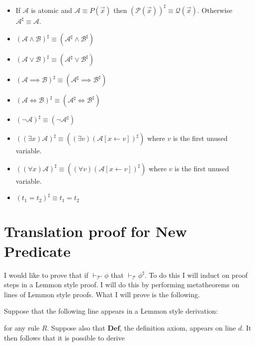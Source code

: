 \documentclass[12pt]{article}
\newcommand{\bv}[1]{\boldsymbol{#1}}
\newcommand{\mc}[1]{\mathcal{#1}}
\newcommand{\bc}[1]{\bv{\mc{#1}}}
\begin{document}
\begin{itemize}
\item{If $\mc{A}$ is atomic and $\mc{A} \equiv P(\vec{x})$ then $(\mc{P}(\vec{x}))^{\sharp} \equiv \mc{Q}(\vec{x})$. Otherwise $\mc{A}^{\sharp} \equiv \mc{A}$.}
\item{$(\mc{A}\land \mc{B})^{\sharp} \equiv (\mc{A}^{\sharp} \land \mc{B}^{\sharp})$}
\item{$(\mc{A} \lor \mc{B})^{\sharp} \equiv (\mc{A}^{\sharp} \lor \mc{B}^{\sharp})$}
\item{$(\mc{A} \implies \mc{B})^{\sharp} \equiv (\mc{A}^{\sharp} \implies \mc{B}^{\sharp})$}
\item{$(\mc{A}\iff \mc{B})^{\sharp} \equiv (\mc{A}^{\sharp} \iff \mc{B}^{\sharp})$}
\item{$(\lnot \mc{A})^{\sharp} \equiv (\lnot \mc{A}^{\sharp})$}
\item{$((\exists x)\mc{A})^{\sharp} \equiv ((\exists v)(\mc{A}[x\leftarrow v])^{\sharp})$ where $v$ is the first unused variable.}
\item{$((\forall x)\mc{A})^{\sharp} \equiv ((\forall v)(\mc{A}[x\leftarrow v])^{\sharp})$ where $v$ is the first unused variable.}
\item{$(t_1=t_2)^{\sharp} \equiv t_1=t_2$}
\end{itemize}

\section*{Translation proof for New Predicate}

I would like to prove that if $\vdash_{\bc{T}'}\phi$ that $\vdash_{\bc{T}}\phi^{\sharp}$. To do this I will induct on proof steps in a Lemmon style proof. I will do this by performing metatheorems on lines of Lemmon style proofs. What I will prove is the following.

Suppose that the following line appears in a Lemmon style derivation:

\begin{ND}[][][][][.6\linewidth]
\end{ND}

for any rule $R$.
Suppose also that $\textbf{Def}$, the definition axiom, appears on line $d$. It then follows that it is possible to derive

\begin{ND}[][][][][.6\linewidth]
\end{ND}
\end{document}
